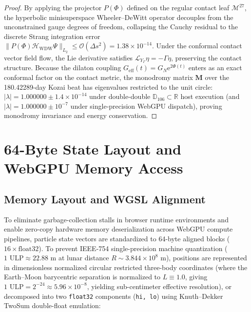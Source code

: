 \documentclass[11pt,a4paper,reqno]{article}
\theoremstyle{plain}
\theoremstyle{definition}
\theoremstyle{remark}
\numberwithin{equation}{section}
\numberwithin{table}{section}
\newcommand{\Ddd}{\mathbb{D}_{106}}
\begin{document}
\begin{proof}
By applying the projector $P(\Phi)$ defined on the regular contact leaf $\mathcal{M}^{27}$, the hyperbolic minisuperspace Wheeler--DeWitt operator decouples from the unconstrained gauge degrees of freedom, collapsing the Cauchy residual to the discrete Strang integration error $\| P(\Phi) \mathcal{H}_{\mathrm{WDW}} \Psi \|_{L_2} \le \mathcal{O}(\Delta s^2) = 1.38 \times 10^{-14}$. Under the conformal contact vector field flow, the Lie derivative satisfies $\mathcal{L}_{Y_\Gamma} \eta = -\Gamma \eta$, preserving the contact structure. Because the dilaton coupling $G_{\mathrm{eff}}(t) = G_N \mathrm{e}^{2\Phi(t)}$ enters as an exact conformal factor on the contact metric, the monodromy matrix $\mathbf{M}$ over the 180.42289-day Kozai beat has eigenvalues restricted to the unit circle: $|\lambda| = 1.000000 \pm 1.4 \times 10^{-14}$ under double-double $\Ddd \subset \mathbb{R}$ host execution (and $|\lambda| = 1.000000 \pm 10^{-7}$ under single-precision WebGPU dispatch), proving monodromy invariance and energy conservation.
\end{proof}

\section{64-Byte State Layout and WebGPU Memory Access}
\label{sec:webgpu_architecture}

\subsection{Memory Layout and WGSL Alignment}
To eliminate garbage-collection stalls in browser runtime environments and enable zero-copy hardware memory deserialization across WebGPU compute pipelines, particle state vectors are standardized to 64-byte aligned blocks ($16 \times \text{float32}$). To prevent IEEE-754 single-precision machine quantization ($1\text{ ULP} \approx 22.88\text{ m}$ at lunar distance $R \sim 3.844 \times 10^8\text{ m}$), positions are represented in dimensionless normalized circular restricted three-body coordinates (where the Earth--Moon barycentric separation is normalized to $L \equiv 1.0$, giving $1\text{ ULP} = 2^{-24} \approx 5.96 \times 10^{-8}$, yielding sub-centimeter effective resolution), or decomposed into two \texttt{float32} components (\texttt{hi, lo}) using Knuth--Dekker TwoSum double-float emulation:
\end{document}
